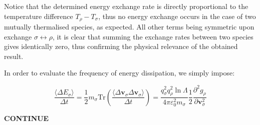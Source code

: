 Notice that the determined energy exchange rate is directly proportional to the temperature difference $T_\rho-T_\sigma$, thus no energy exchange occurs in the case of two mutually thermalised species, as expected. All other terms being symmetric upon exchange $\sigma\leftrightarrow\rho$, it is clear that summing the exchange rates between two species gives identically zero, thus confirming the physical relevance of the obtained result.

\quad In order to evaluate the frequency of energy dissipation, we simply impose:

\begin{equation}
    \frac{\langle\Delta E_\sigma\rangle}{\Delta t}=\frac{1}{2}m_\sigma\text{Tr}\left(\frac{\langle\Delta\mathbf{v}_\sigma\Delta\mathbf{v}_\sigma\rangle}{\Delta t}\right)=\frac{q_\sigma^2q_\rho^2\ln{\Lambda}}{4\pi\varepsilon_0^2m_\sigma}\frac{1}{2}\frac{\partial^2g_\rho}{\partial\mathbf{v}_\sigma^2}
\end{equation}

\begin{center}
    \textbf{CONTINUE}
\end{center}

